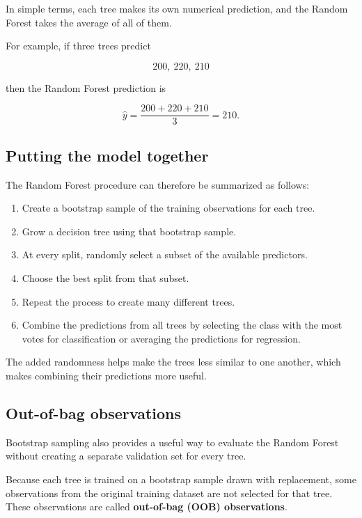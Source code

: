 \documentclass[
  letterpaper,
  DIV=11,
  numbers=noendperiod]{scrreprt}
\providecommand{\tightlist}{%
  \setlength{\itemsep}{0pt}\setlength{\parskip}{0pt}}
\begin{document}
In simple terms, each tree makes its own numerical prediction, and the
Random Forest takes the average of all of them.

For example, if three trees predict

\[
200,\ 220,\ 210
\]

then the Random Forest prediction is

\[
\hat{y}
=
\frac{200+220+210}{3}
=
210.
\]

\subsection{Putting the model
together}\label{putting-the-model-together}

The Random Forest procedure can therefore be summarized as follows:

\begin{enumerate}
\def\labelenumi{\arabic{enumi}.}
\tightlist
\item
  Create a bootstrap sample of the training observations for each tree.
\item
  Grow a decision tree using that bootstrap sample.
\item
  At every split, randomly select a subset of the available predictors.
\item
  Choose the best split from that subset.
\item
  Repeat the process to create many different trees.
\item
  Combine the predictions from all trees by selecting the class with the
  most votes for classification or averaging the predictions for
  regression.
\end{enumerate}

The added randomness helps make the trees less similar to one another,
which makes combining their predictions more useful.

\subsection{Out-of-bag observations}\label{out-of-bag-observations}

Bootstrap sampling also provides a useful way to evaluate the Random
Forest without creating a separate validation set for every tree.

Because each tree is trained on a bootstrap sample drawn with
replacement, some observations from the original training dataset are
not selected for that tree. These observations are called
\textbf{out-of-bag (OOB) observations}.
\end{document}
